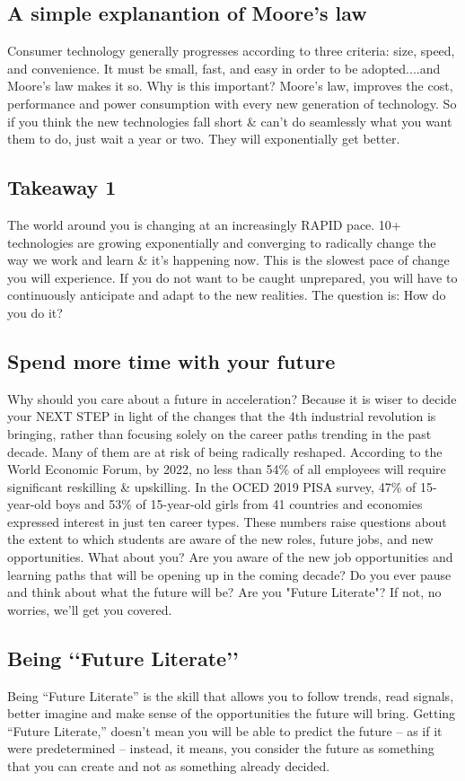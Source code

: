 \documentclass[11pt]{book} %
\begin{document}
	\subsection{A simple explanantion of Moore\rq{}s law}
		Consumer technology generally progresses according to three criteria: size, speed, and convenience. It must be small, fast, and easy in order to be adopted....and Moore's law makes it so. 
		Why is this important? Moore's law, improves the cost, performance and power consumption with every new generation of technology. So if you think the new technologies fall short \& can't do seamlessly what you want them to do, just wait a year or two. They will exponentially get better.
	\subsection{Takeaway 1}
		The world around you is changing at an increasingly RAPID pace. 10+ technologies are growing exponentially and converging to radically change the way we work and learn \& it's happening now.
		This is the slowest pace of change you will experience. If you do not want to be caught unprepared, you will have to continuously anticipate and adapt to the new realities. The question is: How do you do it?
	\subsection{Spend more time with your future}
		Why should you care about a future in acceleration? Because it is wiser to decide your NEXT STEP in light of the changes that the 4th industrial revolution is bringing, rather than focusing solely on the career paths trending in the past decade. Many of them are at risk of being radically reshaped. According to the World Economic Forum, by 2022, no less than 54\% of all employees will require significant reskilling \& upskilling.
		\newline In the OCED 2019 PISA survey, 47\% of 15-year-old boys and 53\% of 15-year-old girls from 41 countries and economies expressed interest in just ten career types. These numbers raise questions about the extent to which students are aware of the new roles, future jobs, and new opportunities.
		What about you? Are you aware of the new job opportunities and learning paths that will be opening up in the coming decade? Do you ever pause and think about what the future will be? Are you "Future Literate"? If not, no worries, we'll get you covered. 
	\subsection{Being \lq\lq{}Future Literate\rq\rq{}}
		Being “Future Literate” is the skill that allows you to follow trends, read signals, better imagine and make sense of the opportunities the future will bring. 
		Getting “Future Literate,” doesn’t mean you will be able to predict the future – as if it were predetermined – instead, it means, you consider the future as something that you can create and not as something already decided. 
		
\end{document}
